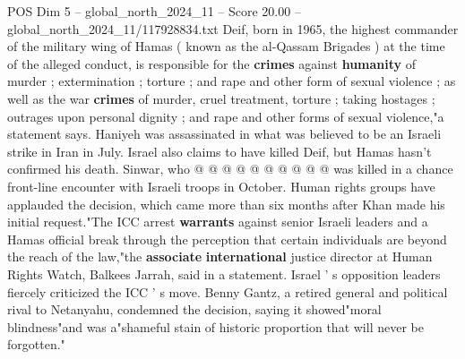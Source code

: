 \begin{textsample}{POS Dim 5 – global\_north\_2024\_11 – Score 20.00 – global\_north\_2024\_11/117928834.txt}
Deif, born in 1965, the highest commander of the military wing of Hamas ( known as the al-Qassam Brigades ) at the time of the alleged conduct, is responsible for the \textbf{crimes} against \textbf{humanity} of murder ; extermination ; torture ; and rape and other form of sexual violence ; as well as the war \textbf{crimes} of murder, cruel treatment, torture ; taking hostages ; outrages upon personal dignity ; and rape and other forms of sexual violence,"a statement says.
Haniyeh was assassinated in what was believed to be an Israeli strike in Iran in July.
Israel also claims to have killed Deif, but Hamas hasn't confirmed his death.
Sinwar, who @ @ @ @ @ @ @ @ @ @ was killed in a chance front-line encounter with Israeli troops in October.
Human rights groups have applauded the decision, which came more than six months after Khan made his initial request."The ICC arrest \textbf{warrants} against senior Israeli leaders and a Hamas official break through the perception that certain individuals are beyond the reach of the law,"the \textbf{associate} \textbf{international} justice director at Human Rights Watch, Balkees Jarrah, said in a statement.
Israel ' s opposition leaders fiercely criticized the ICC ' s move.
Benny Gantz, a retired general and political rival to Netanyahu, condemned the decision, saying it showed"moral blindness"and was a"shameful stain of historic proportion that will never be forgotten."

\end{textsample}
